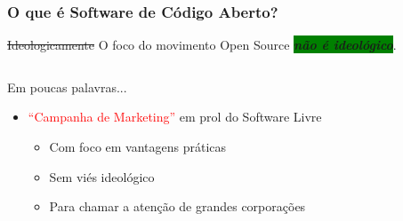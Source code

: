 \documentclass[xcolor=dvipsnames]{beamer}
\newcommand{\tred}[1]{\textcolor{red}{#1}}
\newcommand{\bgreen}[1]{\colorbox{green}{#1}}
\begin{document}
\begin{frame}
	\frametitle{O que é Software de Código Aberto?} 
	\begin{block}{\sout{Ideologicamente}}
    O foco do movimento Open Source \bgreen{{\em {\bf não é ideológico}}}.
 	\end{block}
\begin{columns}
\begin{column}{6cm}
	\begin{block}{Em poucas palavras...}
		  \begin{itemize}
		    \item \tred{``Campanha de Marketing''} em prol do Software 
Livre\vspace{0.1cm}
		    \begin{itemize}
		    \item Com foco em vantagens práticas\vspace{0.1cm}
		    \item Sem viés ideológico\vspace{0.1cm}
		    \item Para chamar a atenção de grandes corporações 
		    \end{itemize}
		  \end{itemize}
	\end{block}
\end{column}

\begin{column}[c]{3.5cm}
	\begin{figure}
	\end{figure}
\end{column}
\end{columns}	
\end{frame}
\end{document}

